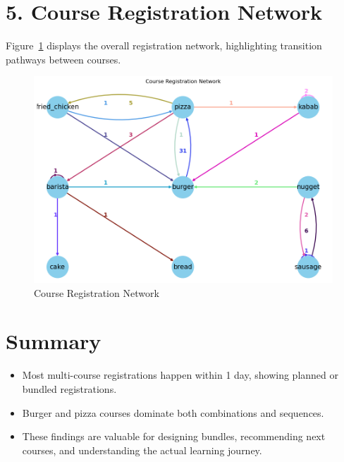 \documentclass[12pt,a4paper]{article}
\begin{document}
\section*{5. Course Registration Network}
Figure~\ref{fig:network} displays the overall registration network, highlighting transition pathways between courses.

\begin{figure}[h!]
    \centering
    \includegraphics[width=1\textwidth]{Course Registration Network.png}
    \caption{Course Registration Network}
    \label{fig:network}
\end{figure}

\clearpage
\section*{Summary}

\begin{itemize}
    \item Most multi-course registrations happen within 1 day, showing planned or bundled registrations.
    \item Burger and pizza courses dominate both combinations and sequences.
    \item These findings are valuable for designing bundles, recommending next courses, and understanding the actual learning journey.
\end{itemize}
\end{document}
